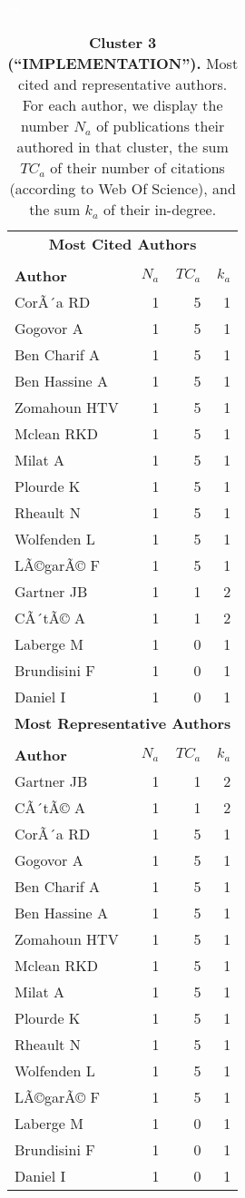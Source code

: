 \documentclass[a4paper,11pt]{report}
\begin{document}
\begin{landscape}
\begin{table}[!ht]
\caption*{{\bf Cluster 3 (``IMPLEMENTATION'').} Most cited and representative authors. For each author, we display the number $N_a$ of publications their authored in that cluster, the sum $TC_a$ of their number of citations (according to Web Of Science), and the sum $k_a$ of their in-degree. }
\textcolor{white}{aa}\\
{\scriptsize\begin{tabular}{|l r r r|}
\hline
\multicolumn{4}{|c|}{{\bf Most Cited Authors}}\\
&&&\\
{\bf Author} & {\bf $N_a$} & {\bf $TC_a$} & {\bf $k_a$}\\
CorÃ´a RD & 1 & 5 & 1 \\
Gogovor A & 1 & 5 & 1 \\
Ben Charif A & 1 & 5 & 1 \\
Ben Hassine A & 1 & 5 & 1 \\
Zomahoun HTV & 1 & 5 & 1 \\
Mclean RKD & 1 & 5 & 1 \\
Milat A & 1 & 5 & 1 \\
Plourde K & 1 & 5 & 1 \\
Rheault N & 1 & 5 & 1 \\
Wolfenden L & 1 & 5 & 1 \\
LÃ©garÃ© F & 1 & 5 & 1 \\
Gartner JB & 1 & 1 & 2 \\
CÃ´tÃ© A & 1 & 1 & 2 \\
Laberge M & 1 & 0 & 1 \\
Brundisini F & 1 & 0 & 1 \\
Daniel I & 1 & 0 & 1 \\
\hline

\hline
\hline
\multicolumn{4}{|c|}{{\bf Most Representative Authors}}\\
&&&\\
{\bf Author} & {\bf $N_a$} & {\bf $TC_a$} & {\bf $k_a$}\\
Gartner JB & 1 & 1 & 2 \\
CÃ´tÃ© A & 1 & 1 & 2 \\
CorÃ´a RD & 1 & 5 & 1 \\
Gogovor A & 1 & 5 & 1 \\
Ben Charif A & 1 & 5 & 1 \\
Ben Hassine A & 1 & 5 & 1 \\
Zomahoun HTV & 1 & 5 & 1 \\
Mclean RKD & 1 & 5 & 1 \\
Milat A & 1 & 5 & 1 \\
Plourde K & 1 & 5 & 1 \\
Rheault N & 1 & 5 & 1 \\
Wolfenden L & 1 & 5 & 1 \\
LÃ©garÃ© F & 1 & 5 & 1 \\
Laberge M & 1 & 0 & 1 \\
Brundisini F & 1 & 0 & 1 \\
Daniel I & 1 & 0 & 1 \\
\hline
\end{tabular}
}
\end{table}


\end{landscape}
\end{document}
